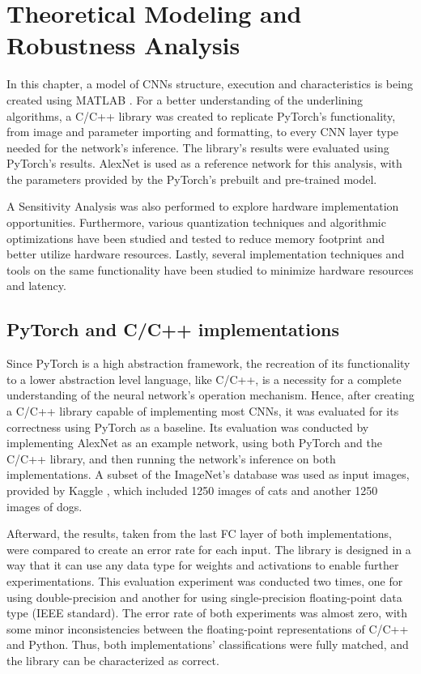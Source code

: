 \chapter{Theoretical Modeling and Robustness Analysis}

\label{Chapter-Theoretical-Modeling-and-Robustness-Analysis}

In this chapter, a model of CNNs structure, execution and characteristics is being created using MATLAB \cite{MATLAB-Official-site}. For a better understanding of the underlining algorithms, a C/C++ library was created to replicate PyTorch's \cite{PyTorch-Official-site} functionality, from image and parameter importing and formatting, to every CNN layer type needed for the network's inference. The library's results were evaluated using PyTorch's results. AlexNet \cite{ImageNet-classification-with-deep-convolutional-neural-networks} is used as a reference network for this analysis, with the parameters provided by the PyTorch's prebuilt and pre-trained model.

A Sensitivity Analysis was also performed to explore hardware implementation opportunities. Furthermore, various quantization techniques and algorithmic optimizations have been studied and tested to reduce memory footprint and better utilize hardware resources. Lastly, several implementation techniques and tools on the same functionality have been studied to minimize hardware resources and latency.

\section{PyTorch and C/C++ implementations}
Since PyTorch is a high abstraction framework, the recreation of its functionality to a lower abstraction level language, like C/C++, is a necessity for a complete understanding of the neural network's operation mechanism. Hence, after creating a C/C++ library capable of implementing most CNNs, it was evaluated for its correctness using PyTorch as a baseline. Its evaluation was conducted by implementing AlexNet as an example network, using both PyTorch and the C/C++ library, and then running the network's inference on both implementations. A subset of the ImageNet's database was used as input images, provided by Kaggle \cite{Kaggle}, which included 1250 images of cats and another 1250 images of dogs.

Afterward, the results, taken from the last FC layer of both implementations, were compared to create an error rate for each input. The library is designed in a way that it can use any data type for weights and activations to enable further experimentations. This evaluation experiment was conducted two times, one for using double-precision and another for using single-precision floating-point data type (IEEE standard). The error rate of both experiments was almost zero, with some minor inconsistencies between the floating-point representations of C/C++ and Python. Thus, both implementations' classifications were fully matched, and the library can be characterized as correct.

